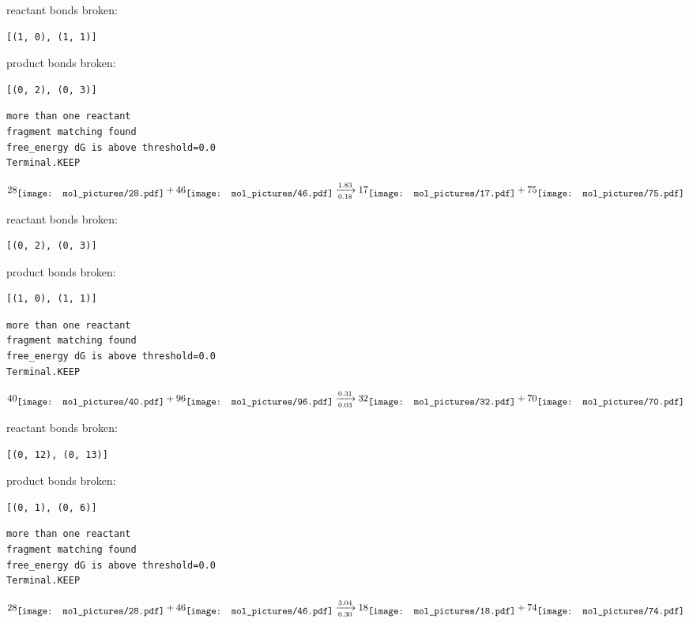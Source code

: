 \documentclass{article}
\begin{document}
reactant bonds broken:\begin{verbatim}
[(1, 0), (1, 1)]
\end{verbatim}
product bonds broken:\begin{verbatim}
[(0, 2), (0, 3)]
\end{verbatim}




\vspace{1cm}
\begin{verbatim}
more than one reactant
fragment matching found
free_energy dG is above threshold=0.0
Terminal.KEEP
\end{verbatim}
$$
28
\raisebox{-.5\height}{\texttt{[image: mol\_pictures/28.pdf]}}
+
46
\raisebox{-.5\height}{\texttt{[image: mol\_pictures/46.pdf]}}
\xrightarrow[0.18]{1.83}
17
\raisebox{-.5\height}{\texttt{[image: mol\_pictures/17.pdf]}}
+
75
\raisebox{-.5\height}{\texttt{[image: mol\_pictures/75.pdf]}}
$$


reactant bonds broken:\begin{verbatim}
[(0, 2), (0, 3)]
\end{verbatim}
product bonds broken:\begin{verbatim}
[(1, 0), (1, 1)]
\end{verbatim}




\vspace{1cm}
\begin{verbatim}
more than one reactant
fragment matching found
free_energy dG is above threshold=0.0
Terminal.KEEP
\end{verbatim}
$$
40
\raisebox{-.5\height}{\texttt{[image: mol\_pictures/40.pdf]}}
+
96
\raisebox{-.5\height}{\texttt{[image: mol\_pictures/96.pdf]}}
\xrightarrow[0.03]{0.31}
32
\raisebox{-.5\height}{\texttt{[image: mol\_pictures/32.pdf]}}
+
70
\raisebox{-.5\height}{\texttt{[image: mol\_pictures/70.pdf]}}
$$


reactant bonds broken:\begin{verbatim}
[(0, 12), (0, 13)]
\end{verbatim}
product bonds broken:\begin{verbatim}
[(0, 1), (0, 6)]
\end{verbatim}




\vspace{1cm}
\begin{verbatim}
more than one reactant
fragment matching found
free_energy dG is above threshold=0.0
Terminal.KEEP
\end{verbatim}
$$
28
\raisebox{-.5\height}{\texttt{[image: mol\_pictures/28.pdf]}}
+
46
\raisebox{-.5\height}{\texttt{[image: mol\_pictures/46.pdf]}}
\xrightarrow[0.30]{3.04}
18
\raisebox{-.5\height}{\texttt{[image: mol\_pictures/18.pdf]}}
+
74
\raisebox{-.5\height}{\texttt{[image: mol\_pictures/74.pdf]}}
$$
\end{document}
